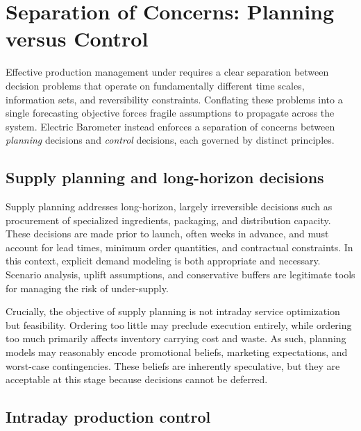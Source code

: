
\section{Separation of Concerns: Planning versus Control}
\label{sec:separation}

Effective production management under \LTOs{} requires a clear separation between decision
problems that operate on fundamentally different time scales, information sets, and reversibility
constraints. Conflating these problems into a single forecasting objective forces fragile assumptions
to propagate across the system. Electric Barometer instead enforces a separation of concerns between
\emph{planning} decisions and \emph{control} decisions, each governed by distinct principles.

\subsection{Supply planning and long-horizon decisions}
\label{subsec:supply-planning}

Supply planning addresses long-horizon, largely irreversible decisions such as procurement of
specialized ingredients, packaging, and distribution capacity. These decisions are made prior to
\LTO{} launch, often weeks in advance, and must account for lead times, minimum order quantities,
and contractual constraints. In this context, explicit \LTO{} demand modeling is both appropriate
and necessary. Scenario analysis, uplift assumptions, and conservative buffers are legitimate tools
for managing the risk of under-supply.

Crucially, the objective of supply planning is not intraday service optimization but feasibility.
Ordering too little may preclude execution entirely, while ordering too much primarily affects
inventory carrying cost and waste. As such, planning models may reasonably encode promotional
beliefs, marketing expectations, and worst-case contingencies. These beliefs are inherently
speculative, but they are acceptable at this stage because decisions cannot be deferred.

\subsection{Intraday production control}
\label{subsec:intraday-control}

